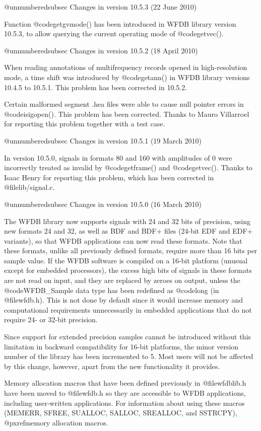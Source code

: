 {{{{{{{{@unnumberedsubsec Changes in version 10.5.3 (22 June 2010)

Function @code{getgvmode()} has been introduced in WFDB library version
10.5.3, to allow querying the current operating mode of @code{getvec()}.

@unnumberedsubsec Changes in version 10.5.2 (18 April 2010)

When reading annotations of multifrequency records opened in
high-resolution mode, a time shift was introduced by @code{getann()} in
WFDB library versions 10.4.5 to 10.5.1.  This problem has been
corrected in 10.5.2.

Certain malformed segment .hea files were able to cause null pointer
errors in @code{isigopen()}.  This problem has been
corrected.  Thanks to Mauro Villarroel for reporting this problem
together with a test case.

@unnumberedsubsec Changes in version 10.5.1 (19 March 2010)

In version 10.5.0, signals in formats 80 and 160 with amplitudes of 0 were
incorrectly treated as invalid by @code{getframe()} and @code{getvec()}.
Thanks to Isaac Henry for reporting this problem, which has been corrected in
@file{lib/signal.c}.

@unnumberedsubsec Changes in version 10.5.0 (16 March 2010)

The WFDB library now supports signals with 24 and 32 bits of precision, using
new formats 24 and 32, as well as BDF and BDF+ files (24-bit EDF and EDF+
variants), so that WFDB applications can now read these formats.  Note that
these formats, unlike all previously defined formats, require more than 16 bits
per sample value.  If the WFDB software is compiled on a 16-bit platform
(unusual except for embedded processors), the excess high bits of signals in
these formats are not read on input, and they are replaced by zeroes on output,
unless the @code{WFDB_Sample} data type has been redefined as @code{long} (in
@file{wfdb.h}).  This is not done by default since it would increase memory and
computational requirements unnecessarily in embedded applications that do not
require 24- or 32-bit precision.

Since support for extended precision samples cannot be introduced
without this limitation in backward compatibility for 16-bit
platforms, the minor version number of the library has been
incremented to 5.  Most users will not be affected by this change,
however, apart from the new functionality it provides.

Memory allocation macros that have been defined previously in
@file{wfdblib.h} have been moved to @file{wfdb.h} so they are
accessible to WFDB applications, including user-written applications.
For information about using these macros (MEMERR, SFREE, SUALLOC,
SALLOC, SREALLOC, and SSTRCPY), @pxref{memory allocation macros}.

}}}}}}}}
